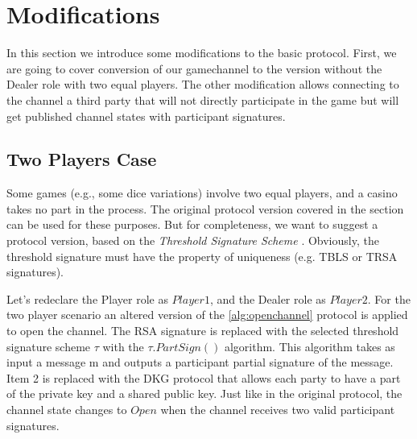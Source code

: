 \section{Modifications}
In this section we introduce some modifications to the basic protocol. First, we are going to cover conversion of our gamechannel to the version without the Dealer role with two equal players. The other modification allows connecting to the channel a third party that will not directly participate in the game but will get published channel states with participant signatures. 

\subsection{Two Players Case}
Some games (e.g., some dice variations) involve two equal players, and a casino takes no part in the process. The original protocol version covered in the  section can be used for these purposes. But for completeness, we want to suggest a protocol version, based on the  \textit {Threshold Signature Scheme} \cite{bib22}. Obviously, the threshold signature must have the property of uniqueness (e.g. TBLS or TRSA \cite{bib23} signatures).

Let’s redeclare the Player role as $Player1$, and the Dealer role as $Player2$. For the two player scenario an altered version of the \autoref{alg:openchannel} protocol is applied to open the channel. The RSA signature is replaced with the selected threshold signature scheme $ \tau $ with the $\tau.PartSign()$ algorithm. This algorithm takes as input a message m and outputs a  participant partial signature of the message. Item 2 is replaced with the DKG protocol that allows each party to have a part of the private key and a shared public key. Just like in the original protocol, the channel state changes to $Open$ when the channel receives two valid participant signatures. 

